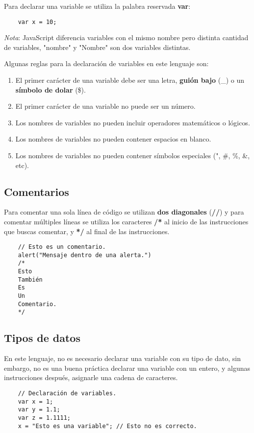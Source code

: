 Para declarar una variable se utiliza la palabra reservada \textbf{var}:
\begin{lstlisting}
    var x = 10;
\end{lstlisting}

\textit{Nota}: JavaScript diferencia variables con el mismo nombre pero distinta cantidad de variables, "nombre" y "Nombre" son dos variables distintas.

Algunas reglas para la declaración de variables en este lenguaje son:
\begin{enumerate}
    \item El primer carácter de una variable debe ser una letra, \textbf{guión bajo} (\_) o un \textbf{símbolo de dolar} (\$).
    \item El primer carácter de una variable no puede ser un número.
    \item Los nombres de variables no pueden incluir operadores matemáticos o lógicos.
    \item Los nombres de variables no pueden contener espacios en blanco.
    \item Los nombres de variables no pueden contener símbolos especiales (", \#, \%, \&, etc).
\end{enumerate}


\subsection{Comentarios}

Para comentar una sola línea de código se utilizan \textbf{dos diagonales} (\textbf{//}) y para comentar múltiples líneas se utiliza los caracteres \textbf{/*} al inicio de las instrucciones que buscas comentar, y \textbf{*/} al final de las instrucciones.
\begin{lstlisting}
    // Esto es un comentario.
    alert("Mensaje dentro de una alerta.")
    /*
    Esto
    También
    Es
    Un
    Comentario.
    */
\end{lstlisting}


\subsection{Tipos de datos}

En este lenguaje, no es necesario declarar una variable con su tipo de dato, sin embargo, no es una buena práctica declarar una variable con un entero, y algunas instrucciones después, asignarle una cadena de caracteres.
\begin{lstlisting}
    // Declaración de variables.
    var x = 1;
    var y = 1.1;
    var z = 1.1111;
    x = "Esto es una variable"; // Esto no es correcto.
\end{lstlisting}

